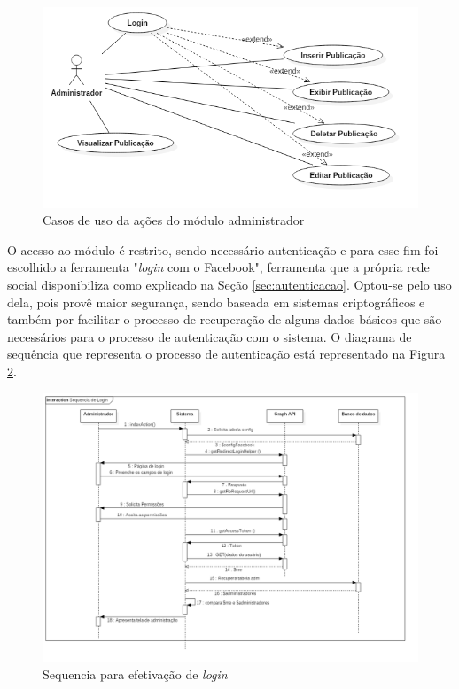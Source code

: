 \begin{figure}[H]
\centering
\includegraphics[scale=0.4]{figuras/casosDeUsoADM}
\caption{Casos de uso da ações do módulo administrador}
\label{fig:casosDeUsoADM}
\end{figure}

O acesso ao módulo é restrito, sendo necessário autenticação e para esse fim foi escolhido a ferramenta "\textit{login} com o Facebook", ferramenta que a própria rede social disponibiliza como explicado na Seção \ref{sec:autenticacao}. Optou-se pelo uso dela, pois provê maior segurança, sendo baseada em sistemas criptográficos e também por facilitar o processo de recuperação de alguns dados básicos que são necessários para o processo de autenticação com o sistema. O diagrama de sequência que representa o processo de autenticação está representado na Figura \ref{fig:sequencialogin}.

\begin{figure}[H]
\centering
\includegraphics[scale=0.3]{figuras/sequencialogin}
\caption{Sequencia para efetivação de \textit{login}}
\label{fig:sequencialogin}
\end{figure}

